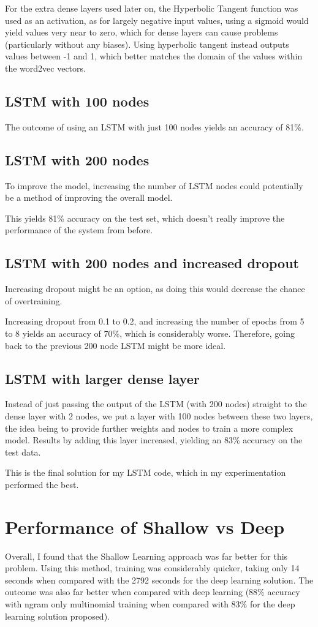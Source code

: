 \documentclass[12pt]{article}
\begin{document}
For the extra dense layers used later on, the Hyperbolic Tangent function was used as an activation, as for largely negative input values, using a sigmoid
would yield values very near to zero, which for dense layers can cause problems (particularly without any biases). Using hyperbolic tangent instead outputs values
between -1 and 1, which better matches the domain of the values within the word2vec vectors. 

\subsection{LSTM with 100 nodes}
The outcome of using an LSTM with just 100 nodes yields an accuracy of 81\%.
\subsection{LSTM with 200 nodes}
To improve the model, increasing the number of LSTM nodes could potentially be a method of improving the 
overall model.

This yields 81\% accuracy on the test set, which doesn't really improve the performance of the system from before.
\subsection{LSTM with 200 nodes and increased dropout}
Increasing dropout might be an option, as doing this would decrease the chance of overtraining.

Increasing dropout from 0.1 to 0.2, and increasing the number of epochs from 5 to 8 yields an
accuracy of 70\%, which is considerably worse. Therefore, going back to the previous 200 node LSTM might be more ideal.

\subsection{LSTM with larger dense layer}
Instead of just passing the output of the LSTM (with 200 nodes) straight to the dense layer with 2 nodes, we put a layer with 100 nodes between these two layers,
the idea being to provide further weights and nodes to train a more complex model. Results by adding this layer increased, yielding an 83\% accuracy on the test data.

This is the final solution for my LSTM code, which in my experimentation performed the best.

\section{Performance of Shallow vs Deep}
Overall, I found that the Shallow Learning approach was far better for this problem. Using this method, training was considerably quicker, taking only 14 seconds when compared with the 2792 seconds for the deep learning solution.
The outcome was also far better when compared with deep learning (88\% accuracy with ngram only multinomial training when compared with 83\% for the deep learning solution proposed).
\end{document}
